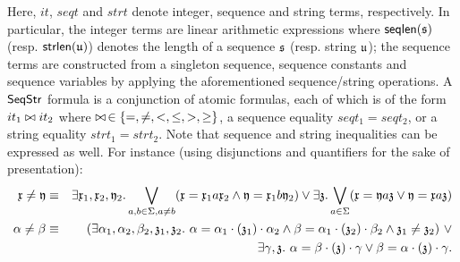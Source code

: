 Here, $it$, $seqt$ and $strt$ denote integer, sequence and string terms, respectively. In particular,
the integer terms are linear arithmetic expressions where $\mathsf{seqlen}(\mathfrak{s})$ (resp. $\mathsf{strlen}(\mathfrak{u})$) denotes the length of a sequence $\mathfrak{s}$ (resp. string $\mathfrak{u}$);
the sequence terms are constructed from a singleton sequence, %
sequence constants and sequence variables by applying the aforementioned sequence/string operations.
%
A ${\sf SeqStr}$ formula is a conjunction of atomic formulas, each of which is of the form $it_1 \bowtie it_2$ where $\bowtie\, \in \{=, \neq, <, \le, >, \ge\}$,  a sequence equality $seqt_1 = seqt_2$, or a string equality $strt_1 = strt_2$.
%
%
Note that sequence and string inequalities can be expressed as well. %
For instance (using disjunctions and quantifiers for the sake of presentation):
%
 \begin{align*}
    \svarx \neq \svary & \equiv& \exists \svarx_1, \svarx_2, \svary_2. \bigvee \limits_{a, b \in \Sigma, a \neq b} (\svarx = \svarx_1 a \svarx_2 \wedge \svary = \svarx_1 b \svary_2) \vee \exists \svarz. \bigvee_{a \in \Sigma} (\svarx = \svary a \svarz \vee \svary = \svarx a \svarz) \\
		\seqvara \neq \seqvarb &\equiv & (\exists \seqvara_1, \seqvara_2, \seqvarb_2, \svarz_1, \svarz_2.\ \seqvara = \seqvara_1 \concat (\svarz_1) \concat \seqvara_2 \wedge \seqvarb = \seqvara_1 \concat (\svarz_2) \concat \seqvarb_2 \wedge \svarz_1 \neq \svarz_2)\ \vee \\
		                   &   & %
                               \exists \seqvarg, \svarz.\ \seqvara  = \seqvarb \concat (\svarz) \concat \seqvarg \vee    \seqvarb  = \seqvara \concat (\svarz) \concat \seqvarg.
\end{align*}
%

